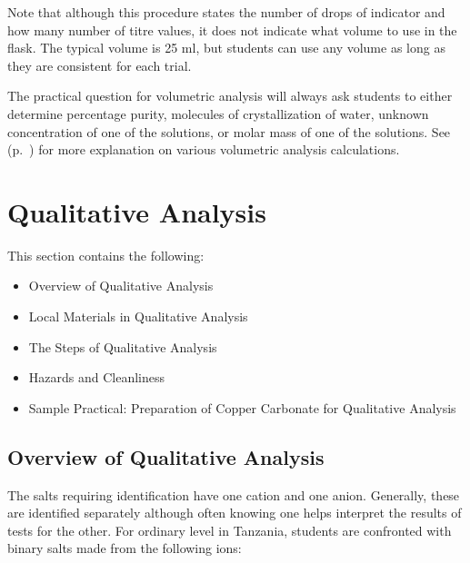 Note that although this procedure states the number of drops of indicator and how many number of titre values, it does not indicate what volume to use in the flask. The typical volume is 25 ml, but students can use any volume as long as they are consistent for each trial.

The practical question for volumetric analysis will always ask students to either determine percentage purity, molecules of crystallization of water, unknown concentration of one of the solutions, or molar mass of one of the solutions. See  (p.~\pageref{sub:titcalc}) for more explanation on various volumetric analysis calculations.





\section{Qualitative Analysis}  
\label{cha:qualana}

This section contains the following:
\begin{itemize}
\item Overview of Qualitative Analysis
\item Local Materials in Qualitative Analysis
\item The Steps of Qualitative Analysis
\item Hazards and Cleanliness
\item Sample Practical: Preparation of Copper Carbonate for Qualitative Analysis
\end{itemize}


\subsection{Overview of Qualitative Analysis}

The salts requiring identification have one cation and one anion. Generally, these are identified separately although often knowing one helps interpret the results of tests for the other. For ordinary level in Tanzania, students are confronted with binary salts made from the following ions:

